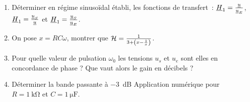 \begin{exercice}
	\begin{enumerate}
		\item Déterminer en régime sinusoïdal établi, les fonctions de transfert~: \(\underline{H}_1 = \frac{\underline{u}}{\underline{u}_E}\), \(\underline{H}_1 = \frac{\underline{u}_S}{\underline{u}}\) et \(\underline{H}_1 = \frac{\underline{u}_S}{\underline{u}_E}\).
		\item On pose \(x = R C \omega\), montrer que \(\mathcal{H} = \frac{1}{3+\left(x-\frac{1}{x} \right)}\).
		\item Pour quelle valeur de pulsation \(\omega_0\) les tensions \(u_s\) et \(u_e\) sont elles en concordance de phase ? Que vaut alors le gain en décibels ?
		\item Déterminer la bande passante à \SI{-3}{\dB} Application numérique pour \(R = \SI{1}{\kilo\ohm}\) et \(C = \SI{1}{\micro\farad}\).
	\end{enumerate}
\end{exercice}

